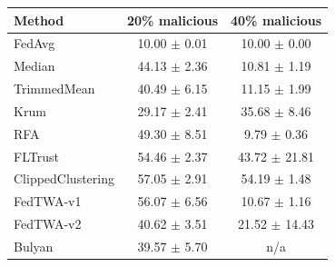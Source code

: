 \begin{tabular}{lcc}
\toprule
Method & 20\% malicious & 40\% malicious \\
\midrule
FedAvg & 10.00 $\pm$ 0.01 & 10.00 $\pm$ 0.00 \\
Median & 44.13 $\pm$ 2.36 & 10.81 $\pm$ 1.19 \\
TrimmedMean & 40.49 $\pm$ 6.15 & 11.15 $\pm$ 1.99 \\
Krum & 29.17 $\pm$ 2.41 & 35.68 $\pm$ 8.46 \\
RFA & 49.30 $\pm$ 8.51 & 9.79 $\pm$ 0.36 \\
FLTrust & 54.46 $\pm$ 2.37 & 43.72 $\pm$ 21.81 \\
ClippedClustering & 57.05 $\pm$ 2.91 & 54.19 $\pm$ 1.48 \\
FedTWA-v1 & 56.07 $\pm$ 6.56 & 10.67 $\pm$ 1.16 \\
FedTWA-v2 & 40.62 $\pm$ 3.51 & 21.52 $\pm$ 14.43 \\
Bulyan & 39.57 $\pm$ 5.70 & n/a \\
\bottomrule
\end{tabular}